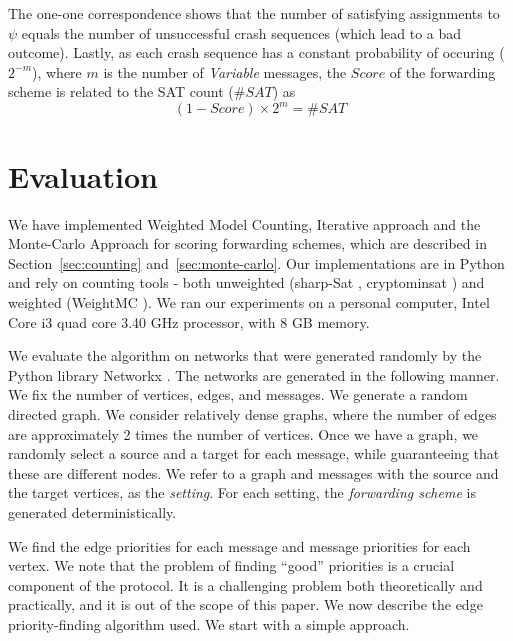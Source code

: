 \documentclass[11pt,eepic]{article}
\begin{document}
	The one-one correspondence shows that the number of satisfying assignments to $\psi$ equals the number of unsuccessful crash sequences (which lead to a bad outcome). Lastly, as each crash sequence has a constant probability of occuring ($2^{-m}$), where $m$ is the number of {\it Variable} messages, the $Score$ of the forwarding scheme is related to the SAT count ($\#SAT$) as $$(1-Score)\times 2^m = \# SAT$$
	
\section{Evaluation}
	\label{sec:eval}
	We have implemented Weighted Model Counting, Iterative approach and the Monte-Carlo Approach for scoring forwarding schemes, which are described in Section~\ref{sec:counting} and~\ref{sec:monte-carlo}. Our implementations are in Python and rely on counting tools - both unweighted (sharp-Sat \cite{sharpSat}, cryptominsat \cite{cryptominsat}) and weighted (WeightMC \cite{WeightMC}). We ran our experiments on a personal computer, Intel Core i3 quad core 3.40 GHz processor, with 8 GB memory.

		We evaluate the algorithm on networks that were generated randomly by the Python library Networkx
		 \cite{HSS08}.
		The networks are generated in the following manner.
		We fix the number of vertices, edges, and messages.
		We generate a random directed graph.
		We consider relatively dense graphs, where the number of edges are approximately 2 times the number of vertices.
		Once we have a graph, we randomly select a source and a target for each message,
		while guaranteeing that these are different nodes.
		We refer to a graph and messages with the source and the target vertices,
		as the {\em setting}.
		For each setting, the {\em forwarding scheme} is generated deterministically.

		We find the edge priorities for each message and message priorities for each vertex. We note that the problem of finding ``good'' priorities is a crucial component of the protocol. It is a challenging problem both theoretically and practically, and it is out of the scope of this paper. We now describe the edge priority-finding algorithm used. We start with a simple approach.
\end{document}
